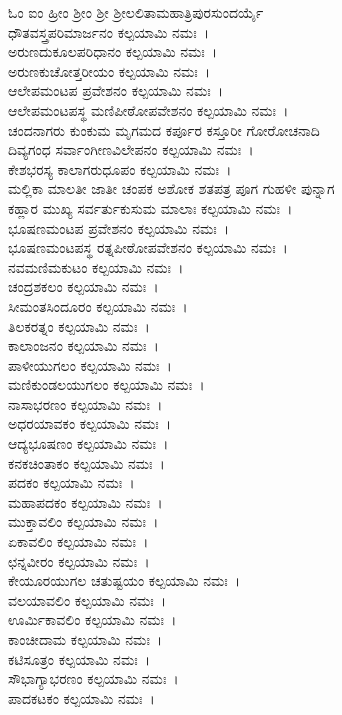 ಓಂ ಐಂ ಹ್ರೀಂ ಶ್ರೀಂ ಶ್ರೀ ಶ್ರೀಲಲಿತಾಮಹಾತ್ರಿಪುರಸುಂದರ್ಯೈ \\ಧೌತವಸ್ತ್ರಪರಿಮಾರ್ಜನಂ ಕಲ್ಪಯಾಮಿ ನಮಃ~।\\
ಅರುಣದುಕೂಲಪರಿಧಾನಂ ಕಲ್ಪಯಾಮಿ ನಮಃ~।\\
ಅರುಣಕುಚೋತ್ತರೀಯಂ ಕಲ್ಪಯಾಮಿ ನಮಃ~।\\
ಆಲೇಪಮಂಟಪ ಪ್ರವೇಶನಂ ಕಲ್ಪಯಾಮಿ ನಮಃ~।\\
ಆಲೇಪಮಂಟಪಸ್ಥ ಮಣಿಪೀಠೋಪವೇಶನಂ ಕಲ್ಪಯಾಮಿ ನಮಃ~।\\
ಚಂದನಾಗರು ಕುಂಕುಮ ಮೃಗಮದ ಕರ್ಪೂರ ಕಸ್ತೂರೀ ಗೋರೋಚನಾದಿ\\ ದಿವ್ಯಗಂಧ ಸರ್ವಾಂಗೀಣವಿಲೇಪನಂ ಕಲ್ಪಯಾಮಿ ನಮಃ~।\\
ಕೇಶಭರಸ್ಯ ಕಾಲಾಗರುಧೂಪಂ ಕಲ್ಪಯಾಮಿ ನಮಃ~।\\
ಮಲ್ಲಿಕಾ ಮಾಲತೀ ಜಾತೀ ಚಂಪಕ ಅಶೋಕ ಶತಪತ್ರ ಪೂಗ ಗುಹಳೀ ಪುನ್ನಾಗ \\ಕಹ್ಲಾರ ಮುಖ್ಯ ಸರ್ವರ್ತುಕುಸುಮ ಮಾಲಾಃ ಕಲ್ಪಯಾಮಿ ನಮಃ~।\\
ಭೂಷಣಮಂಟಪ ಪ್ರವೇಶನಂ ಕಲ್ಪಯಾಮಿ ನಮಃ~।\\
ಭೂಷಣಮಂಟಪಸ್ಥ ರತ್ನಪೀಠೋಪವೇಶನಂ ಕಲ್ಪಯಾಮಿ ನಮಃ~।\\
ನವಮಣಿಮಕುಟಂ ಕಲ್ಪಯಾಮಿ ನಮಃ~।\\
ಚಂದ್ರಶಕಲಂ ಕಲ್ಪಯಾಮಿ ನಮಃ~।\\
ಸೀಮಂತಸಿಂದೂರಂ ಕಲ್ಪಯಾಮಿ ನಮಃ~।\\
ತಿಲಕರತ್ನಂ ಕಲ್ಪಯಾಮಿ ನಮಃ~।\\
ಕಾಲಾಂಜನಂ ಕಲ್ಪಯಾಮಿ ನಮಃ~।\\
ಪಾಳೀಯುಗಲಂ ಕಲ್ಪಯಾಮಿ ನಮಃ~।\\
ಮಣಿಕುಂಡಲಯುಗಲಂ ಕಲ್ಪಯಾಮಿ ನಮಃ~।\\
ನಾಸಾಭರಣಂ ಕಲ್ಪಯಾಮಿ ನಮಃ~।\\
ಅಧರಯಾವಕಂ ಕಲ್ಪಯಾಮಿ ನಮಃ~।\\
ಆದ್ಯಭೂಷಣಂ ಕಲ್ಪಯಾಮಿ ನಮಃ~।\\
ಕನಕಚಿಂತಾಕಂ ಕಲ್ಪಯಾಮಿ ನಮಃ~।\\
ಪದಕಂ ಕಲ್ಪಯಾಮಿ ನಮಃ~।\\
ಮಹಾಪದಕಂ ಕಲ್ಪಯಾಮಿ ನಮಃ~।\\
ಮುಕ್ತಾವಲಿಂ ಕಲ್ಪಯಾಮಿ ನಮಃ~।\\
ಏಕಾವಲಿಂ ಕಲ್ಪಯಾಮಿ ನಮಃ~।\\
ಛನ್ನವೀರಂ ಕಲ್ಪಯಾಮಿ ನಮಃ~।\\
ಕೇಯೂರಯುಗಲ ಚತುಷ್ಟಯಂ ಕಲ್ಪಯಾಮಿ ನಮಃ~।\\
ವಲಯಾವಲಿಂ ಕಲ್ಪಯಾಮಿ ನಮಃ~।\\
ಊರ್ಮಿಕಾವಲಿಂ ಕಲ್ಪಯಾಮಿ ನಮಃ~।\\
ಕಾಂಚೀದಾಮ ಕಲ್ಪಯಾಮಿ ನಮಃ~।\\
ಕಟಿಸೂತ್ರಂ ಕಲ್ಪಯಾಮಿ ನಮಃ~।\\
ಸೌಭಾಗ್ಯಾಭರಣಂ ಕಲ್ಪಯಾಮಿ ನಮಃ~।\\
ಪಾದಕಟಕಂ ಕಲ್ಪಯಾಮಿ ನಮಃ~।\\
